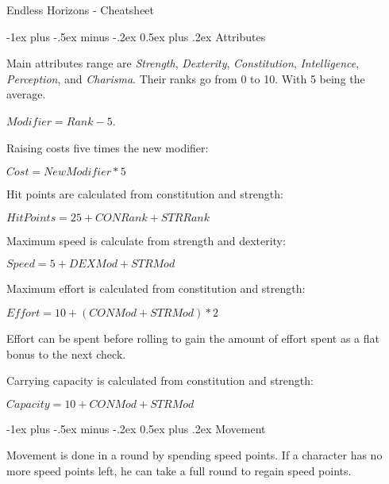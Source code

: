 \documentclass[8pt,landscape,a4paper]{article}
\makeatletter
\renewcommand{\section}{\@startsection{section}{1}{0mm}%
                                {-1ex plus -.5ex minus -.2ex}%
                                {0.5ex plus .2ex}%
                                {\normalfont\large\bfseries}}
\makeatother
\begin{document}
\raggedright
\footnotesize
\begin{multicols}{4}


\setlength{\premulticols}{1pt}
\setlength{\postmulticols}{1pt}
\setlength{\multicolsep}{1pt}
\setlength{\columnsep}{2pt}

\begin{center}
     \Large{Endless Horizons - Cheatsheet} \\
\end{center}

\section{Attributes}

Main attributes range are \emph{Strength}, \emph{Dexterity},
\emph{Constitution}, \emph{Intelligence}, \emph{Perception},
and \emph{Charisma}. Their ranks go from 0 to 10. With 5 being
the average.

\( Modifier = Rank - 5 \).

Raising costs five times the new modifier:

\( Cost = NewModifier * 5 \)

Hit points are calculated from constitution and strength:

\( Hit Points = 25 + CON Rank + STR Rank \)

Maximum speed is calculate from strength and dexterity:

\( Speed = 5 + DEX Mod + STR Mod \)

Maximum effort is calculated from constitution and strength:

\( Effort = 10 + (CON Mod + STR Mod) * 2 \)

Effort can be spent before rolling to gain the amount of effort spent as a flat
bonus to the next check.

Carrying capacity is calculated from constitution and strength:

\( Capacity = 10 + CON Mod + STR Mod \)

\section{Movement}

Movement is done in a round by spending speed points. If a character has
no more speed points left, he can take a full round to regain speed points.


\end{multicols}
\end{document}
